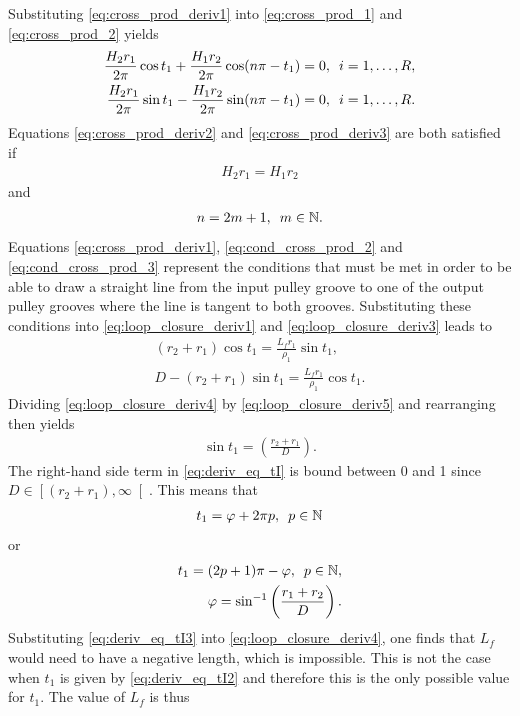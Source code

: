 Substituting \eqref{eq:cross_prod_deriv1} into \eqref{eq:cross_prod_1} and \eqref{eq:cross_prod_2} yields
\begin{align}
    \frac{H_2r_1}{2\pi}\cos t_1 + \frac{H_1r_2}{2\pi}\cos(n\pi-t_1)=0,\hquad i=1,\ldots ,R,\label{eq:cross_prod_deriv2}\\
    \frac{H_2r_1}{2\pi}\sin t_1-\frac{H_1r_2}{2\pi}\sin( n\pi-t_1)=0,\label{eq:cross_prod_deriv3}\hquad i=1 ,\ldots , R.
\end{align}
Equations \eqref{eq:cross_prod_deriv2} and \eqref{eq:cross_prod_deriv3} are both satisfied if 
\begin{align}
    H_2r_1 = H_1r_2\label{eq:cond_cross_prod_2}
\end{align} 
and 
\begin{align}
    n = 2m+1, \hquad m \in \mathbb{N}.\label{eq:cond_cross_prod_3}
\end{align}
Equations \eqref{eq:cross_prod_deriv1}, \eqref{eq:cond_cross_prod_2} and \eqref{eq:cond_cross_prod_3} represent the conditions that must be met in order to be able to draw a straight line from the input pulley groove to one of the output pulley grooves where the line is tangent to both grooves. Substituting these conditions into \eqref{eq:loop_closure_deriv1} and \eqref{eq:loop_closure_deriv3} leads to
\begin{align}
    (r_2+r_1)\cos t_1 = \frac{L_fr_1}{\rho_1}\sin t_1,\label{eq:loop_closure_deriv4}\\
    D - \left(r_2+r_1\right)\sin t_1 = \frac{L_fr_1}{\rho_1}\cos t_1.\label{eq:loop_closure_deriv5}
\end{align}
Dividing  \eqref{eq:loop_closure_deriv4} by \eqref{eq:loop_closure_deriv5} and rearranging then yields
\begin{align}
   \sin t_1 = \left(\frac{r_2+r_1}{D}\right).\label{eq:deriv_eq_tI}
\end{align}
The right-hand side term in \eqref{eq:deriv_eq_tI} is bound between 0 and 1 since $D\in\left[(r_2+r_1),\infty \right[$. This means that 
\begin{align}
    t_1 =  \varphi + 2\pi p,\hquad p \in \mathbb{N}\label{eq:deriv_eq_tI2}
\end{align}
or 
\begin{align}
    t_1 =(2p+1)\pi-\varphi,\hquad p \in \mathbb{N},\label{eq:deriv_eq_tI3}\\
    \varphi = \sin^{-1}\left(\frac{r_1+r_2}{D}\right).
\end{align}
Substituting \eqref{eq:deriv_eq_tI3} into \eqref{eq:loop_closure_deriv4}, one finds that $L_f$ would need to have a negative length, which is impossible. This is not the case when $t_1$ is given by \eqref{eq:deriv_eq_tI2} and therefore this is the only possible value for $t_1$. The value of $L_f$ is thus

